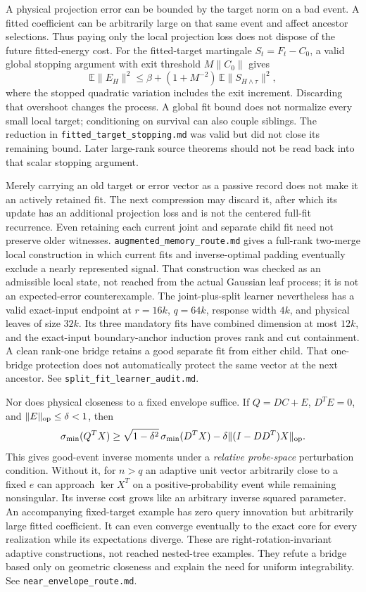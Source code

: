 \documentclass[11pt,oneside,openany,a4paper]{book}
\numberwithin{equation}{chapter}
\theoremstyle{definition}
\theoremstyle{remark}
\newcommand{\sourcefile}[1]{{\small\nolinkurl{#1}}}
\begin{document}
A physical projection error can be bounded by the target norm on a bad
event.  A fitted coefficient can be arbitrarily large on that same
event and affect ancestor selections.  Thus paying only the local
projection loss does not dispose of the future fitted-energy cost.
For the fitted-target martingale $S_t=F_t-C_0$, a valid global stopping
argument with exit threshold $M\|C_0\|$ gives
\[
 \mathbb E\|E_H\|^2\le
 \beta+(1+M^{-2})\,
 \mathbb E\|S_{H\wedge\tau}\|^2,
\]
where the stopped quadratic variation includes the exit increment.
Discarding that overshoot changes the process.  A global fit bound does
not normalize every small local target; conditioning on survival can
also couple siblings.  The reduction in
\sourcefile{fitted_target_stopping.md} was valid but did not close its
remaining bound.  Later large-rank source theorems should not be read
back into that scalar stopping argument.

Merely carrying an old target or error vector as a passive record
does not make it an actively retained fit.  The next compression may
discard it, after which its update has an additional projection loss
and is not the centered full-fit recurrence.  Even retaining each
current joint and separate child fit need not preserve older witnesses.
\sourcefile{augmented_memory_route.md} gives a full-rank two-merge
local construction in which current fits and inverse-optimal padding
eventually exclude a nearly represented signal.  That construction
was checked as an admissible local state, not reached from the actual
Gaussian leaf process; it is not an expected-error counterexample.
The joint-plus-split learner nevertheless has a valid exact-input
endpoint at $r=16k$, $q=64k$, response width $4k$, and physical leaves
of size $32k$.  Its three mandatory fits have combined dimension at
most $12k$, and the exact-input boundary-anchor induction proves rank
and cut containment.  A clean rank-one bridge retains a good separate
fit from either child.  That one-bridge protection does not automatically
protect the same vector at the next ancestor.
See \sourcefile{split_fit_learner_audit.md}.

Nor does physical closeness to a fixed envelope suffice.  If
$Q=DC+E$, $D^TE=0$, and $\|E\|_{\rm op}\le\delta<1$, then
\[
 \sigma_{\min}(Q^TX)\ge
 \sqrt{1-\delta^2}\,\sigma_{\min}(D^TX)
   -\delta\|(I-DD^T)X\|_{\rm op}.
\]
This gives good-event inverse moments under a \emph{relative
probe-space} perturbation condition.  Without it, for $n>q$ an adaptive
unit vector arbitrarily close to a fixed $e$ can approach
$\ker X^T$ on a positive-probability event while remaining nonsingular.
Its inverse cost grows like an arbitrary inverse squared parameter.
An accompanying fixed-target example has zero query innovation but
arbitrarily large fitted coefficient.  It can even converge eventually
to the exact core for every realization while its expectations diverge.
These are right-rotation-invariant adaptive constructions, not reached
nested-tree examples.  They refute a bridge based only on geometric
closeness and explain the need for uniform integrability.
See \sourcefile{near_envelope_route.md}.
\end{document}
